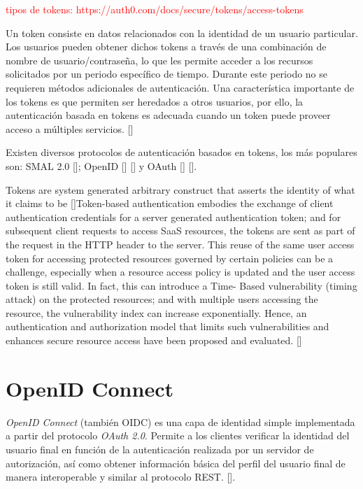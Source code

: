 \textcolor{red}{tipos de tokens: https://auth0.com/docs/secure/tokens/access-tokens}

Un token consiste en datos relacionados con la identidad de un usuario particular. Los usuarios pueden obtener dichos tokens a través de una combinación de nombre de usuario/contraseña, lo que les permite acceder a los recursos solicitados por un periodo específico de tiempo. Durante este periodo no se requieren métodos adicionales de autenticación. Una característica importante de los tokens es que permiten ser heredados a otros usuarios, por ello, la autenticación basada en tokens es adecuada cuando un token puede proveer acceso a múltiples servicios. [\cite{banerjee2018token}] %

Existen diversos protocolos de autenticación basados en tokens, los más populares son: SMAL 2.0 [\cite{cantor2005assertions}]; OpenID [\cite{recordon2006openid}] [\cite{mainka2017sok}] y OAuth [\cite{hardt2012oauth}] [\cite{richer2017oauth}]. 

Tokens are system generated arbitrary construct that asserts the identity of what it claims to be [\cite{zheng2014token}]Token-based authentication embodies the exchange of client authentication credentials for a server generated authentication token; and for subsequent client requests to access SaaS resources, the tokens are sent as part of the request in the HTTP header to the server. This reuse of the same user access token for accessing protected resources governed by certain policies can be a challenge, especially when a resource access policy is updated and the user access token is still valid. In fact, this can introduce a Time- Based vulnerability (timing attack) on the protected resources; and with multiple users accessing the resource, the vulnerability index can increase exponentially. Hence, an authentication and authorization model that limits such vulnerabilities and enhances secure resource access have been proposed and evaluated. [\cite{ethelbert2017json}]

\section{OpenID Connect}
\textit{OpenID Connect}  (también OIDC) es una capa de identidad simple implementada a partir del protocolo \textit{OAuth 2.0}. Permite a los clientes verificar la identidad del usuario final en función de la autenticación realizada por un servidor de autorización, así como obtener información básica del perfil del usuario final de manera interoperable y similar al protocolo REST. [\cite{openid-doc}]. 

